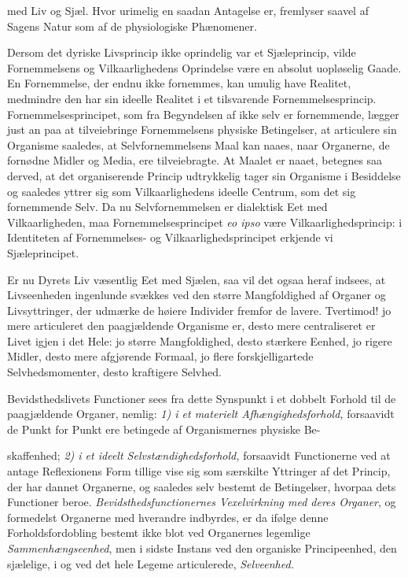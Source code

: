 \documentclass[12pt,a4paper]{book}
\begin{document}
med Liv og Sjæl. Hvor urimelig en saadan Antagelse er, fremlyser saavel
af Sagens Natur som af de physiologiske Phænomener.

Dersom det dyriske Livsprincip ikke oprindelig var et Sjæleprincip, vilde
Fornemmelsens og Vilkaarlighedens Oprindelse være en absolut uopløselig
Gaade. En Fornemmelse, der endnu ikke fornemmes, kan umulig have
Realitet, medmindre den har sin ideelle Realitet i et tilsvarende
Fornemmelsesprincip. Fornemmelsesprincipet, som fra Begyndelsen af ikke
selv er fornemmende, lægger just an paa at tilveiebringe Fornemmelsens
physiske Betingelser, at articulere sin Organisme saaledes, at
Selvfornemmelsens Maal kan naaes, naar Organerne, de fornødne Midler og
Media, ere tilveiebragte. At Maalet er naaet, betegnes saa derved, at det
organiserende Princip udtrykkelig tager sin Organisme i Besiddelse og
saaledes yttrer sig som Vilkaarlighedens ideelle Centrum, som det sig
fornemmende Selv. Da nu Selvfornemmelsen er dialektisk Eet med
Vilkaarligheden, maa Fornemmelsesprincipet \textit{eo ipso} være
Vilkaarlighedsprincip: i Identiteten af Fornemmelses- og
Vilkaarlighedsprincipet erkjende vi Sjæleprincipet.

Er nu Dyrets Liv væsentlig Eet med Sjælen, saa vil det ogsaa heraf
indsees, at Livseenheden ingenlunde svækkes ved den større Mangfoldighed
af Organer og Livsyttringer, der udmærke de høiere Individer fremfor de
lavere. Tvertimod! jo mere articuleret den paagjældende Organisme er,
desto mere centraliseret er Livet igjen i det Hele: jo større
Mangfoldighed, desto stærkere Eenhed, jo rigere Midler, desto mere
afgjørende Formaal, jo flere forskjelligartede Selvhedsmomenter, desto
kraftigere Selvhed.

Bevidsthedslivets Functioner sees fra dette Synspunkt i et dobbelt
Forhold til de paagjældende Organer, nemlig: \emph{1) i et materielt
Afhængighedsforhold,} forsaavidt de Punkt for Punkt ere betingede af
Organismernes physiske Be-

\setcounter{footnote}{0}
skaffenhed; \emph{2) i et ideelt Selvstændighedsforhold,} forsaavidt
Functionerne ved at antage Reflexionens Form tillige vise sig som
særskilte Yttringer af det Princip, der har dannet Organerne, og saaledes
selv bestemt de Betingelser, hvorpaa dets Functioner beroe.
\emph{Bevidsthedsfunctionernes Vexelvirkning med deres Organer}, og
formedelst Organerne med hverandre indbyrdes, er da ifølge denne
Forholdsfordobling bestemt ikke blot ved Organernes legemlige
\emph{Sammenhængseenhed}, men i sidste Instans ved den organiske
Principeenhed, den sjælelige, i og ved det hele Legeme articulerede,
\emph{Selveenhed.}
\end{document}
